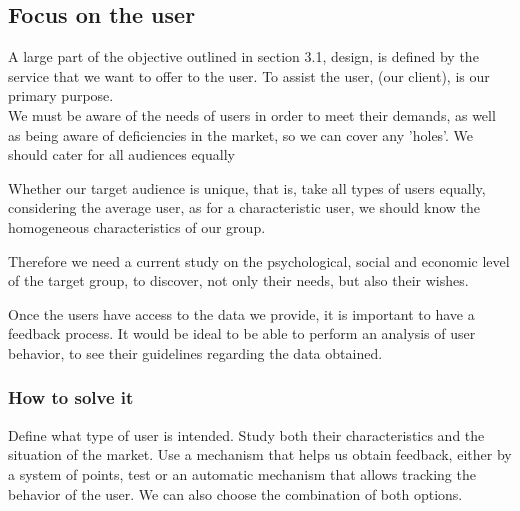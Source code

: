 \subsection{Focus on the user}
A large part of the objective outlined in section 3.1, design, is defined by the service that we want to offer
to the user. To assist the user, (our client), is our primary purpose. \\


We must be aware of the needs of users in order to meet their demands, as well as being aware of deficiencies in the market, so we can cover any 'holes'.
We should cater for all audiences equally 

Whether our target audience is unique, that is, take all types of users equally, considering the
average user, as for a characteristic user, we should know the homogeneous characteristics of our group.

Therefore we need a current study on the psychological, social and economic level of the target group, to discover, not only
their needs, but also their wishes.

Once the users have access to the data we provide, it is important to have a feedback process.
It would be ideal to be able to perform an analysis of user behavior, to see their guidelines regarding the data obtained.
\subsubsection{How to solve it} 
Define what type of user is intended. Study both their characteristics and the situation of the
market.
Use a mechanism that helps us obtain feedback, either by a system of points, test or
an automatic mechanism that allows tracking the behavior of the user. We can also choose the combination of both
options.

